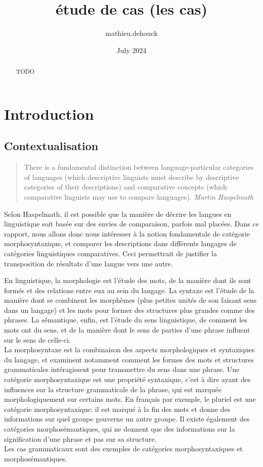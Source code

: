 \documentclass{article}
\title{étude de cas (les cas)}
\author{mathieu.dehouck}
\date{July 2024}
\begin{document}
\maketitle

\begin{abstract}
TODO
\end{abstract}


\section{Introduction}\label{sec:introduction}
\subsection{Contextualisation}\label{subsec:contextualisation}
\begin{quote}
        There is a fundamental distinction between language-particular categories of languages (which descriptive linguists must describe by descriptive categories of their descriptions) and comparative concepts (which comparative linguists may use to compare languages).
        {\flushright \textit{Martin Haspelmath} \cite{Has18}}
\end{quote}

Selon Haspelmath, il est possible que la manière de décrire les langues en linguistique soit basée sur des envies de comparaison, parfois mal placées.
Dans ce rapport, nous allons donc nous intéresser à la notion fondamentale de catégorie morphosyntaxique, et comparer les descriptions dans différents langages de catégories linguistiques comparatives.
Ceci permettrait de justifier la transposition de résultats d'une langue vers une autre.

\medskip
\label{subsec:linguistique}
En linguistique, la morphologie est l'étude des mots, de la manière dont ils sont formés et des relations entre eux au sein du langage.
La syntaxe est l'étude de la manière dont se combinent les morphèmes (plus petites unités de son faisant sens dans un langage) et les mots pour former des structures plus grandes comme des phrases.
La sémantique, enfin, est l'étude du sens linguistique, de comment les mots ont du sens, et de la manière dont le sens de parties d'une phrase influent sur le sens de celle-ci.\\
La morphosyntaxe est la combinaison des aspects morphologiques et syntaxiques du langage, et examinent notamment comment les formes des mots et structures grammaticales intéragissent pour transmettre du sens dans une phrase.
Une catégorie morphosyntaxique est une propriété syntaxique, c'est à dire ayant des influences sur la structure grammaticale de la phrase, qui est marquée morphologiquement sur certains mots.
En français par exemple, le pluriel est une catégorie morphosyntaxique: il est marqué à la fin des mots et donne des informations sur quel groupe gouverne un autre groupe.
Il existe également des catégories morphosémantiques, qui ne donnent que des informations sur la signification d'une phrase et pas sur sa structure.\\
\medskip
Les cas grammaticaux sont des exemples de catégories morphosyntaxiques et morphosémantiques.
\end{document}
